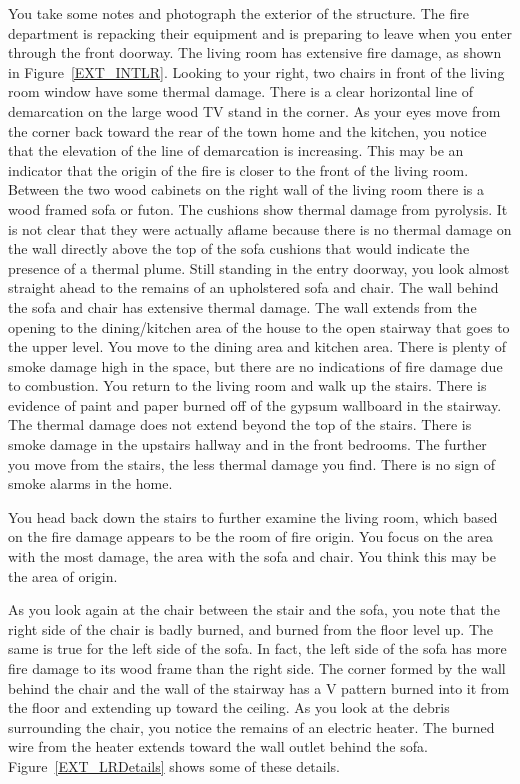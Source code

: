 \documentclass[twoside]{uocthesis}
\begin{document}
{You take some notes and photograph the exterior of the structure.  The fire department is repacking their equipment and is preparing to leave when you enter through the front doorway.  The living room has extensive fire damage, as shown in Figure~\ref{EXT_INTLR}.  Looking to your right, two chairs in front of the living room window have some thermal damage.  There is a clear horizontal line of demarcation on the large wood TV stand in the corner.  As your eyes move from the corner back toward the rear of the town home and the kitchen, you notice that the elevation of the line of demarcation is increasing.  This may be an indicator that the origin of the fire is closer to the front of the living room.  Between the two wood cabinets on the right wall of the living room there is a wood framed sofa or futon.  The cushions show thermal damage from pyrolysis.  It is not clear that they were actually aflame because there is no thermal damage on the wall directly above the top of the sofa cushions that would indicate the presence of a thermal plume.  Still standing in the entry doorway, you look almost straight ahead to the remains of an upholstered sofa and chair.  The wall behind the sofa and chair has extensive thermal damage.  The wall extends from the opening to the dining/kitchen area of the house to the open stairway that goes to the upper level.  You move to the dining area and kitchen area.  There is plenty of smoke damage high in the space, but there are no indications of fire damage due to combustion.  You return to the living room and walk up the stairs.  There is evidence of paint and paper burned off of the gypsum wallboard in the stairway.  The thermal damage does not extend beyond the top of the stairs.  There is smoke damage in the upstairs hallway and in the front bedrooms. The further you move from the stairs, the less thermal damage you find. There is no sign of smoke alarms in the home.  

You head back down the stairs to further examine the living room, which based on the fire damage appears to be the room of fire origin. You focus on the area with the most damage, the area with the sofa and chair.  You think this may be the area of origin.  

As you look again at the chair between the stair and the sofa, you note that the right side of the chair is badly burned, and burned from the floor level up.  The same is true for the left side of the sofa.  In fact, the left side of the sofa has more fire damage to its wood frame than the right side.  The corner formed by the wall behind the chair and the wall of the stairway has a V pattern burned into it from the floor and extending up toward the ceiling.  As you look at the debris surrounding the chair, you notice the remains of an electric heater.  The burned wire from the heater extends toward the wall outlet behind the sofa. Figure~\ref{EXT_LRDetails} shows some of these details.

}
\end{document}
